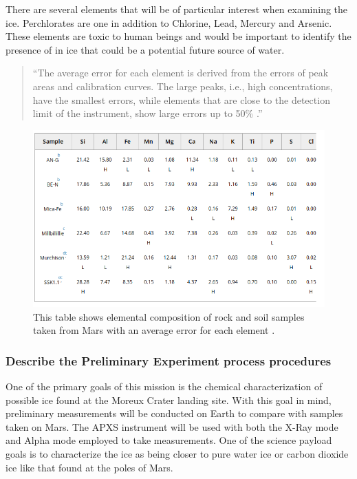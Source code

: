 \documentclass[%
 portrait,
 aapm,
 mph,%
 amsmath,amssymb,
 reprint,%
]{revtex4-2}
\begin{document}
\newpage
There are several elements that will be of particular interest when examining the ice. Perchlorates are one in addition to Chlorine, Lead, Mercury and Arsenic. These elements are toxic to human beings and would be important to identify the presence of in ice that could be a potential future source of water. 
\begin{quote}
    “The average error for each element is derived from the errors of peak areas and calibration curves. The large peaks, i.e., high concentrations, have the smallest errors, while elements that are close to the detection limit of the instrument, show large errors up to 50\% \cite{bruckner2003refined}.” 
\end{quote}
\begin{figure}
  \includegraphics[width=\textwidth]{Instruments/APXSdata03.png}
   \caption{This table shows elemental composition of rock and soil samples taken from Mars with an average error for each element \cite{bruckner2003refined}.}
\end{figure} 



\subsubsection{Describe the Preliminary Experiment process procedures}
One of the primary goals of this mission is the chemical characterization of possible ice found at the Moreux Crater landing site. With this goal in mind, preliminary measurements will be conducted on Earth to compare with samples taken on Mars. The APXS instrument will be used with both the X-Ray mode and Alpha mode employed to take measurements. One of the science payload goals is to characterize the ice as being closer to pure water ice or carbon dioxide ice like that found at the poles of Mars. 
\end{document}
